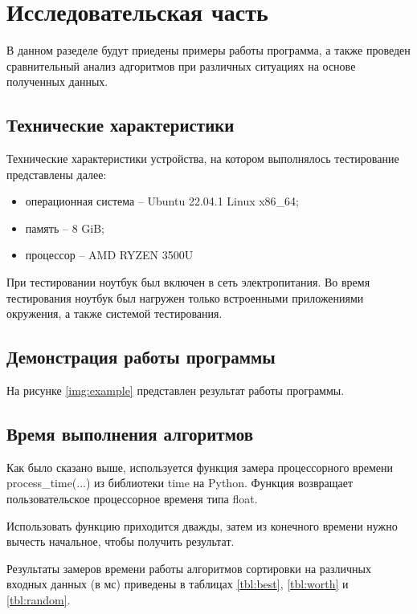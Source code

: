 \chapter{Исследовательская часть}

В данном разеделе будут приедены примеры работы программа, а также проведен сравнительный анализ адгоритмов при различных ситуациях на основе полученных данных.

\section{Технические характеристики}

Технические характеристики устройства, на котором выполнялось тестирование представлены далее:

\begin{itemize}
    \item операционная система -- Ubuntu 22.04.1 \cite{ubuntu} Linux x86\_64;
    \item память -- 8 GiB;
    \item процессор -- AMD RYZEN 3500U 
\end{itemize}

При тестировании ноутбук был включен в сеть электропитания. Во время тестирования ноутбук был нагружен только встроенными приложениями окружения, а также системой тестирования.

\section{Демонстрация работы программы}

На рисунке \ref{img:example} представлен результат работы программы.

\clearpage

\section{Время выполнения алгоритмов}

Как было сказано выше, используется функция замера процессорного времени process\_time(...) из библиотеки time на Python. Функция возвращает пользовательское процессорное временя типа float.

Использовать функцию приходится дважды, затем из конечного времени нужно вычесть начальное, чтобы получить результат.

Результаты замеров времени работы алгоритмов сортировки на различных входных данных (в мс) приведены в таблицах \ref{tbl:best}, \ref{tbl:worth} и \ref{tbl:random}.

